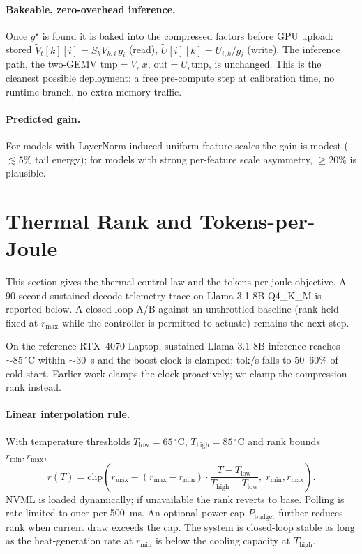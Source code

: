 \documentclass[11pt]{article}
\begin{document}
\paragraph{Bakeable, zero-overhead inference.}  Once $g^\star$ is found it
is baked into the compressed factors before GPU upload: stored
$\widetilde V_t[k][i]=S_kV_{k,i}\,g_i$ (read), $\widetilde
U[i][k]=U_{i,k}/g_i$ (write).  The inference path, the two-GEMV
$\mathrm{tmp}=V_r^\top x$, $\mathrm{out}=U_r\mathrm{tmp}$, is unchanged.
This is the cleanest possible deployment: a free pre-compute step at
calibration time, no runtime branch, no extra memory traffic.

\paragraph{Predicted gain.}  For models with LayerNorm-induced uniform
feature scales the gain is modest ($\lesssim 5\%$ tail energy); for models
with strong per-feature scale asymmetry, $\geq 20\%$ is plausible.

\section{Thermal Rank and Tokens-per-Joule}
\label{sec:thermal}
This section gives the thermal control law and the tokens-per-joule
objective. A 90-second sustained-decode telemetry trace on Llama-3.1-8B
Q4\_K\_M is reported below. A closed-loop A/B against an unthrottled
baseline (rank held fixed at $r_\text{max}$ while the controller is
permitted to actuate) remains the next step.

On the reference RTX~4070 Laptop, sustained Llama-3.1-8B inference reaches
$\sim 85\,^\circ\mathrm{C}$ within $\sim 30$~s and the boost clock is
clamped; tok/s falls to 50--60\% of cold-start.  Earlier work clamps the
clock proactively; we clamp the compression rank instead.

\paragraph{Linear interpolation rule.}
With temperature thresholds $T_\text{low}{=}65\,^\circ\mathrm{C}$,
$T_\text{high}{=}85\,^\circ\mathrm{C}$ and rank bounds $r_\text{min},r_\text{max}$,
\[
r(T)=\mathrm{clip}\!\left(r_\text{max}-(r_\text{max}-r_\text{min})\cdot
\frac{T-T_\text{low}}{T_\text{high}-T_\text{low}},\;r_\text{min},r_\text{max}\right).
\]
NVML is loaded dynamically; if unavailable the rank reverts to base.
Polling is rate-limited to once per 500~ms.  An optional power cap
$P_\text{budget}$ further reduces rank when current draw exceeds the cap.
The system is closed-loop stable as long as the heat-generation rate at
$r_\text{min}$ is below the cooling capacity at $T_\text{high}$.
\end{document}
